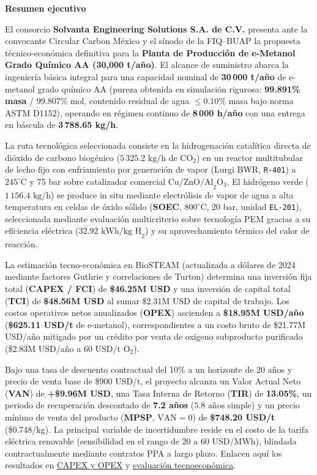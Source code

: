 \documentclass[11pt,letterpaper]{article}
\newcommand{\Proyecto}{Planta de Producción de e-Metanol Grado Químico AA (30,000 t/año)}
\newcommand{\Firma}{Solvanta Engineering Solutions S.A. de C.V.}
\newcommand{\Guia}[2]{%
  \begin{tcolorbox}[colback=Arena,colframe=Terracota,boxrule=0.35pt,
    leftrule=2pt,arc=0pt,left=7pt,right=7pt,
    top=4pt,bottom=4pt,before skip=5pt,after skip=5pt]
    {\sffamily\small\bfseries\color{Grafito}#1}\par #2
  \end{tcolorbox}}
\begin{document}
\Guia{Resumen ejecutivo}{%
  El consorcio \textbf{\Firma} presenta ante la convocante Circular Carbon México y el sínodo de la FIQ--BUAP la propuesta técnico-económica definitiva para la \textbf{\Proyecto}. El alcance de suministro abarca la ingeniería básica integral para una capacidad nominal de \textbf{30\,000 t/año} de e-metanol grado químico AA (pureza obtenida en simulación rigurosa: \textbf{99.891\% masa} / 99.807\% mol, contenido residual de agua $\le 0.10\%$ masa bajo norma ASTM D1152), operando en régimen continuo de \textbf{8\,000 h/año} con una entrega en báscula de \textbf{3\,788.65 kg/h}.
  
  La ruta tecnológica seleccionada consiste en la hidrogenación catalítica directa de dióxido de carbono biogénico ($5\,325.2\mbox{ kg/h}$ de $\mbox{CO}_2$) en un reactor multitubular de lecho fijo con enfriamiento por generación de vapor (Lurgi BWR, \texttt{R-401}) a $245^\circ\mbox{C}$ y 75 bar sobre catalizador comercial $\mbox{Cu/ZnO/Al}_2\mbox{O}_3$. El hidrógeno verde ($1\,156.4\mbox{ kg/h}$) se produce in situ mediante electrólisis de vapor de agua a alta temperatura en celdas de óxido sólido (\textbf{SOEC}, $800^\circ\mbox{C}$, 20 bar, unidad \texttt{EL-201}), seleccionada mediante evaluación multicriterio sobre tecnología PEM gracias a su eficiencia eléctrica ($32.92\mbox{ kWh/kg H}_2$) y su aprovechamiento térmico del calor de reacción.
  
  La estimación tecno-económica en BioSTEAM (actualizada a dólares de 2024 mediante factores Guthrie y correlaciones de Turton) determina una inversión fija total (\textbf{CAPEX / FCI}) de \textbf{\$46.25M USD} y una inversión de capital total (\textbf{TCI}) de \textbf{\$48.56M USD} al sumar \$2.31M USD de capital de trabajo. Los costos operativos netos anualizados (\textbf{OPEX}) ascienden a \textbf{\$18.95M USD/año} (\textbf{\$625.11 USD/t} de e-metanol), correspondientes a un costo bruto de \$21.77M USD/año mitigado por un crédito por venta de oxígeno subproducto purificado (\$2.83M USD/año a 60 USD/t $\mbox{O}_2$).
  
  Bajo una tasa de descuento contractual del 10\% a un horizonte de 20 años y precio de venta base de \$900 USD/t, el proyecto alcanza un Valor Actual Neto (\textbf{VAN}) de \textbf{+\$9.96M USD}, una Tasa Interna de Retorno (\textbf{TIR}) de \textbf{13.05\%}, un periodo de recuperación descontado de \textbf{7.2 años} ($5.8\mbox{ años}$ simple) y un precio mínimo de venta del producto (\textbf{MPSP}, $\mbox{VAN}=0$) de \textbf{\$748.20 USD/t} (\$0.748/kg). La principal variable de incertidumbre reside en el costo de la tarifa eléctrica renovable (sensibilidad en el rango de 20 a 60 USD/MWh), blindada contractualmente mediante contratos PPA a largo plazo. Enlacen aquí los resultados en \hyperref[cap:costos]{CAPEX y OPEX} y \hyperref[cap:tea]{evaluación tecnoeconómica}.}
\end{document}
